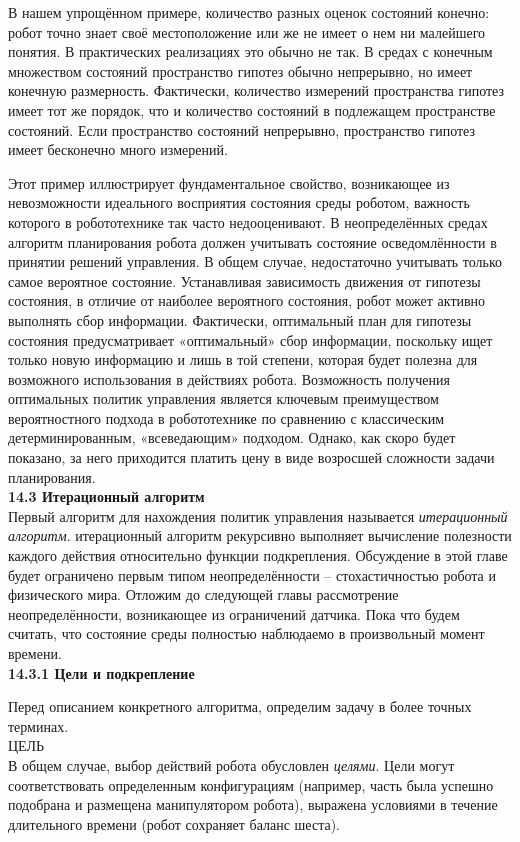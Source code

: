 \documentclass[10pt,a4paper]{article}
\begin{document}
В нашем упрощённом примере, количество разных оценок состояний конечно: робот точно знает своё местоположение или же не имеет о нем ни малейшего понятия. В практических реализациях это обычно не так. В средах с конечным множеством состояний пространство гипотез обычно непрерывно, но имеет конечную размерность. Фактически, количество измерений пространства гипотез имеет тот же порядок, что и количество состояний в подлежащем пространстве состояний. Если пространство состояний непрерывно, пространство гипотез имеет бесконечно много измерений.

Этот пример иллюстрирует фундаментальное свойство, возникающее из невозможности идеального восприятия состояния среды роботом, важность которого в робототехнике так часто недооценивают. В неопределённых средах алгоритм планирования робота должен учитывать состояние осведомлённости в принятии решений управления. В общем случае, недостаточно учитывать только самое вероятное состояние. Устанавливая зависимость движения от гипотезы состояния, в отличие от наиболее вероятного состояния, робот может активно выполнять сбор информации. Фактически, оптимальный план для гипотезы состояния предусматривает «оптимальный» сбор информации, поскольку ищет только новую информацию и лишь в той степени, которая будет полезна для возможного использования в действиях робота. Возможность получения оптимальных политик управления является ключевым преимуществом вероятностного подхода в робототехнике по сравнению с классическим детерминированным, «всеведающим» подходом. Однако, как скоро будет показано, за него приходится платить цену в виде возросшей сложности задачи планирования.\\

\textbf{14.3	Итерационный алгоритм}\\

Первый алгоритм для нахождения политик управления называется \textit{итерационный алгоритм}. итерационный алгоритм рекурсивно выполняет вычисление полезности каждого действия относительно функции подкрепления. Обсуждение в этой главе будет ограничено первым типом неопределённости – стохастичностью робота и физического мира. Отложим до следующей главы рассмотрение неопределённости, возникающее из ограничений датчика. Пока что будем считать, что состояние среды полностью наблюдаемо в произвольный момент времени.\\

\textbf{14.3.1	Цели и подкрепление}

Перед описанием конкретного алгоритма, определим задачу в более точных терминах.\\ 
ЦЕЛЬ\\
В общем случае, выбор действий робота обусловлен \textit{целями}. Цели могут соответствовать определенным конфигурациям (например, часть была успешно подобрана и размещена манипулятором робота), выражена условиями в течение длительного времени (робот сохраняет баланс шеста).\\
\end{document}
